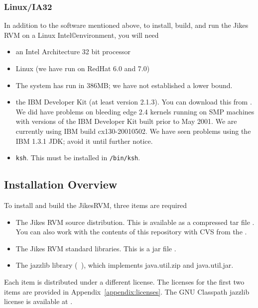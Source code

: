 \subsubsection{Linux/IA32}
In addition to the software mentioned above, to install, build, and
run the Jikes RVM on a Linux Intel\copyright environment, you will need 
\begin{itemize}
\item an Intel Architecture 32 bit processor
\item Linux  (we have run on RedHat 6.0 and 7.0)
\item The system has run in 386MB; we have not established a lower bound.
\item the IBM Developer Kit (at least version 2.1.3).  You can
download this from 
\xlink{{\tt \LinuxJdkURL}} {\LinuxJdkURL}.  We did have problems on
bleeding edge 2.4 kernels running on SMP machines with versions of the IBM
Developer Kit built prior to May 2001.  We are currently using IBM
build cx130-20010502.  We have seen problems using the IBM 1.3.1 JDK;
avoid it until further notice.
\item {\tt ksh}. This must be installed in {\tt /bin/ksh}.
\end{itemize}

\AIXPPCJikesTMFooter

\JavaTMFooter

\subsection{Installation Overview}

To install and build the Jikes\trademark RVM, three items are required
\begin{itemize}
\item The Jikes RVM source distribution.  This is available as a
compressed tar file {\tt \RVMTarFile}.  You can also work with the
contents of this repository with CVS from the 
.

\item The Jikes RVM standard libraries. This is a jar file {\tt \LibTarFile}.

\item The 
 jazzlib library ({\tt
\jazzlibjarfile}), which 
implements java.util.zip and java.util.jar. 
\end{itemize}

Each item is distributed under a different license.  The licenses for
the first two items are provided in Appendix~\ref{appendix:licenses}.  The GNU
Classpath jazzlib license is available at
\xlink{{\tt \classpathURL}}{\classpathURL}.

